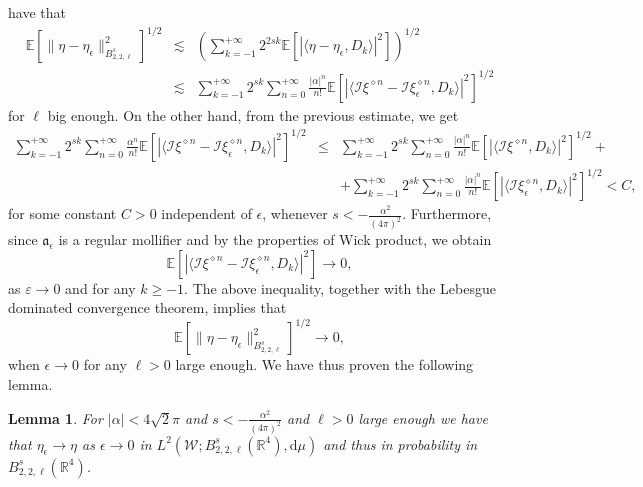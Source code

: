 \documentclass[a4paper,10pt]{article}
\newcommand{\mathd}{\mathrm{d}}
\newtheorem{lemma}[theorem]{Lemma}
\begin{document}
have that
\begin{eqnarray}
  \mathbb{E} [\| \eta - \eta_{\epsilon} \|_{B^s_{2, 2, \ell}}^2]^{1 / 2} &
  \lesssim & \left( \sum_{k = - 1}^{+ \infty} 2^{2 s k} \mathbb{E}[| \langle
  \eta - \eta_{\epsilon}, D_k \rangle |^2] \right)^{1 / 2} \nonumber\\
  & \lesssim & \sum_{k = - 1}^{+ \infty} 2^{s k} \sum^{+ \infty}_{n = 0}
  \frac{| \alpha |^n}{n!} \mathbb{E} [| \langle \mathcal{I} \xi^{\diamond n} -
  \mathcal{I} \xi_{\epsilon}^{\diamond n}, D_k \rangle |^2]^{1 / 2} \nonumber
\end{eqnarray}
for $\ell$ big enough. On the other hand, from the previous estimate, we get
\begin{eqnarray}
  \sum_{k = - 1}^{+ \infty} 2^{s k} \sum^{+ \infty}_{n = 0}
  \frac{\alpha^n}{n!} \mathbb{E} [| \langle \mathcal{I} \xi^{\diamond n} -
  \mathcal{I} \xi_{\epsilon}^{\diamond n}, D_k \rangle |^2]^{1 / 2} &
  \leqslant & \sum_{k = - 1}^{+ \infty} 2^{s k} \sum^{+ \infty}_{n = 0}
  \frac{| \alpha |^n}{n!} \mathbb{E} [| \langle \mathcal{I} \xi^{\diamond n},
  D_k \rangle |^2]^{1 / 2} + \nonumber\\
  &  & + \sum_{k = - 1}^{+ \infty} 2^{s k} \sum^{+ \infty}_{n = 0} \frac{|
  \alpha |^n}{n!} \mathbb{E} [| \langle \mathcal{I} \xi_{\epsilon}^{\diamond
  n}, D_k \rangle |^2]^{1 / 2} < C, \nonumber
\end{eqnarray}
for some constant $C > 0$ independent of $\epsilon$, whenever $s < -
\frac{\alpha^2}{(4 \pi)^2}$. Furthermore, since $\mathfrak{a}_{\epsilon}$ is a
regular mollifier and by the properties of Wick product, we obtain
\[ \mathbb{E} [| \langle \mathcal{I} \xi^{\diamond n} - \mathcal{I}
   \xi_{\epsilon}^{\diamond n}, D_k \rangle |^2] \rightarrow 0, \]
as $\varepsilon \rightarrow 0$ and for any $k \geq - 1$. The above inequality,
together with the Lebesgue dominated convergence theorem, implies that
\[ \mathbb{E} [\| \eta - \eta_{\epsilon} \|_{B^s_{2, 2, \ell}}^2]^{1 / 2}
   \rightarrow 0, \]
when $\epsilon \rightarrow 0$ for any $\ell > 0$ large enough. We have thus
proven the following lemma.

\begin{lemma}
  \label{lemma_L2}For $| \alpha | < 4 \sqrt{2} \pi$ and $s < -
  \frac{\alpha^2}{(4 \pi)^2}$ and $\ell > 0$ large enough we have that
  $\eta_{\epsilon} \rightarrow \eta$ as $\epsilon \rightarrow 0$ in $L^2
  (\mathcal{W} ; B^s_{2, 2, \ell} (\mathbb{R}^4), \mathd \mu)$ and thus in
  probability in $B^s_{2, 2, \ell} (\mathbb{R}^4)$.
\end{lemma}
\end{document}
